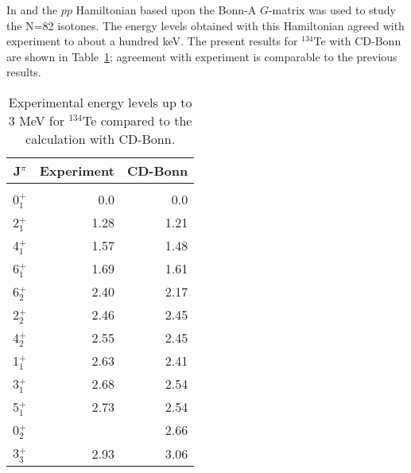 \documentclass[aps,twocolumn,superscriptaddress,prc,showpacs]{revtex4}
\begin{document}
In \cite{Ho97} and \cite{Su98} the $  pp  $ Hamiltonian
based upon the Bonn-A $  G  $-matrix was used to study the
N=82 isotones. The energy levels obtained with this
Hamiltonian agreed with experiment to about a hundred keV.
The present results for $^{134}$Te with CD-Bonn are shown in Table~\ref{tab1};
agreement with experiment is comparable to the previous results.
\begingroup
\begin{table}
 \caption{\label{tab1} Experimental energy levels up to 3 MeV for
$^{134}$Te compared to
the calculation with CD-Bonn.}
\begin{ruledtabular}
\begin{tabular}{rrr}
J$^{ \pi }$ & Experiment & CD-Bonn  \\
\hline \\
 0$^{ + }_{1}$ & 0.0  & 0.0    \\
 2$^{ + }_{1}$ & 1.28 & 1.21   \\
 4$^{ + }_{1}$ & 1.57 & 1.48 \\
 6$^{ + }_{1}$ & 1.69 & 1.61 \\
 6$^{ + }_{2}$ & 2.40 & 2.17  \\
 2$^{ + }_{2}$ & 2.46 & 2.45  \\
 4$^{ + }_{2}$ & 2.55 & 2.45  \\
 1$^{ + }_{1}$ & 2.63 & 2.41   \\
 3$^{ + }_{1}$ & 2.68 & 2.54  \\
 5$^{ + }_{1}$ & 2.73 & 2.54  \\
 0$^{ + }_{2}$ &      & 2.66  \\
 3$^{ + }_{3}$ & 2.93 & 3.06  \\
\end{tabular}
\end{ruledtabular}
\end{table}
\endgroup
\end{document}
